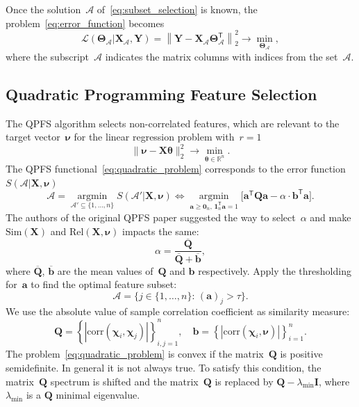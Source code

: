 \documentclass[12pt,twoside]{article}
\theoremstyle{definition}
\newcommand{\ba}{\mathbf{a}}
\newcommand{\bb}{\mathbf{b}}
\newcommand{\bY}{\mathbf{Y}}
\newcommand{\bX}{\mathbf{X}}
\newcommand{\bQ}{\mathbf{Q}}
\newcommand{\bbR}{\mathbb{R}}
\newcommand{\cA}{\mathcal{A}}
\newcommand{\T}{\mathsf{T}}
\newcommand{\bchi}{\boldsymbol{\chi}}
\newcommand{\bnu}{\boldsymbol{\nu}}
\newcommand{\btheta}{\boldsymbol{\theta}}
\newcommand{\bTheta}{\boldsymbol{\Theta}}
\newcommand{\bOne}{\boldsymbol{1}}
\newcommand{\bZero}{\boldsymbol{0}}
\newcommand{\argmin}{\mathop{\arg \min}\limits}
\begin{document}
Once the solution~$\cA$ of~\eqref{eq:subset_selection} is known, the problem~\eqref{eq:error_function} becomes
\begin{equation}
\mathcal{L}(\bTheta_{\cA} | \bX_{\cA}, \bY) = {\left\| \mathbf{Y} - \bX_{\cA}\bTheta^{\T}_{\cA} \right\| }_2^2 \rightarrow\min_{\bTheta_{\cA}},
\end{equation}
where the subscript~$\cA$ indicates the matrix columns with indices from the set~$\cA$.

\subsection{Quadratic Programming Feature Selection}
The QPFS algorithm selects non-correlated features, which are relevant to the target vector~$\bnu$ for the linear regression problem with~$r=1$
\begin{equation*}
	\| \bnu - \bX \btheta\|_2^2 \rightarrow\min_{\btheta \in \bbR^{n}}.
\end{equation*}
The QPFS functional~\eqref{eq:quadratic_problem} corresponds to the error function~$S(\cA | \bX, \bnu)$
\begin{equation*}
\cA = \argmin_{\cA' \subseteq \{1, \dots, n\}} S(\cA' | \bX, \bnu) \Leftrightarrow \argmin_{\ba \geq \bZero_n, \, \bOne_n^{\T}\ba=1} \bigl[\ba^{\T} \bQ \ba - \alpha \cdot \mathbf{b}^{\T} \ba \bigr].
\end{equation*}
The authors of the original QPFS paper suggested the way to select~$\alpha$ and make $\text{Sim}(\bX)$ and $\text{Rel}(\bX, \bnu)$ impacts the same:
\begin{equation*}
	\alpha = \frac{\overline{\bQ}}{\overline{\bQ} + \overline{\bb}},
\end{equation*}
where $\overline{\bQ}$, $\overline{\bb}$ are the mean values of~$\bQ$ and $\bb$ respectively.
Apply the thresholding for~$\ba$ to find the optimal feature subset:
\[
	\cA = \bigl\{ j \in \{1, \dots, n\}: \, (\ba)_j > \tau \bigr\}.
\]
We use the absolute value of sample correlation coefficient as similarity measure:
\begin{equation}
	\bQ = \left\{\left|\text{corr}(\bchi_i, \bchi_j)\right|\right\}_{i,j=1}^n, \quad \bb = \left\{\left|\text{corr}(\bchi_i, \bnu)\right|\right\}_{i=1}^n.
	\label{eq:qpfs_1d_qb}
\end{equation}
The problem~\eqref{eq:quadratic_problem} is convex if the matrix~$\bQ$ is positive semidefinite. In general it is not always true.
To satisfy this condition, the matrix~$\bQ$ spectrum is shifted and the matrix~$\bQ$ is replaced by $\bQ - \lambda_{\text{min}} \mathbf{I}$, where $\lambda_{\text{min}} $ is a $\bQ$ minimal eigenvalue.
\end{document}
